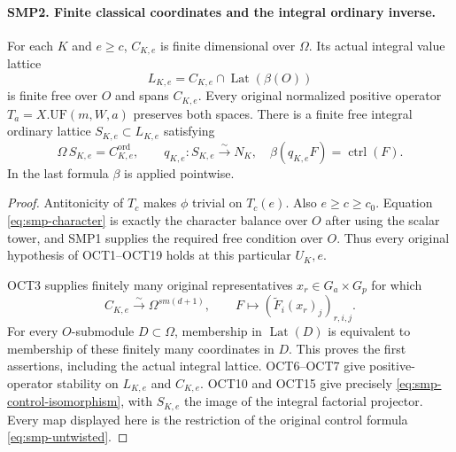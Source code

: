 \paragraph{SMP2. Finite classical coordinates and the integral ordinary inverse.}
\label{claim:SMP2}
For each $K$ and $e\geq c$, $C_{K,e}$ is finite
dimensional over $\Omega$.  Its actual integral value
lattice
\[
     L_{K,e}=C_{K,e}\cap\operatorname{Lat}(\beta(O))
\]
is finite free over $O$ and spans $C_{K,e}$.
Every original normalized positive operator
$T_a=X.\mathrm{UF}(m,W,a)$ preserves both spaces.
There is a finite free integral ordinary lattice
$S_{K,e}\subset L_{K,e}$ satisfying
\begin{equation}\label{eq:smp-control-isomorphism}
 \Omega\,S_{K,e}=C^{\mathrm{ord}}_{K,e},\qquad
 q_{K,e}:S_{K,e}\xrightarrow{\sim}N_K,
       \quad \beta(q_{K,e}F)=\operatorname{ctrl}(F).
\end{equation}
In the last formula $\beta$ is applied pointwise.
\begin{proof}
Antitonicity of $T_c$ makes $\phi$ trivial on $T_c(e)$.
Also $e\geq c\geq c_0$.  Equation
\eqref{eq:smp-character} is exactly the character
balance over $O$ after using the scalar tower, and
SMP1 supplies the required free condition over $O$.
Thus every original hypothesis of OCT1--OCT19 holds
at this particular $U_K,e$.

OCT3 supplies finitely many original representatives
$x_r\in G_a\times G_p$ for which
\begin{equation}\label{eq:smp-evaluation}
 C_{K,e}\xrightarrow{\sim}\Omega^{s m(d+1)},\qquad
            F\longmapsto(\widetilde F_i(x_r)_j)_{r,i,j}.
\end{equation}
For every $O$-submodule $D\subset\Omega$, membership
in $\operatorname{Lat}(D)$ is equivalent to membership
of these finitely many coordinates in $D$.
This proves the first assertions, including the actual
integral lattice.  OCT6--OCT7 give positive-operator
stability on $L_{K,e}$ and $C_{K,e}$.  OCT10 and OCT15
give precisely \eqref{eq:smp-control-isomorphism}, with
$S_{K,e}$ the image of the integral factorial projector.
Every map displayed here is the restriction of the
original control formula \eqref{eq:smp-untwisted}.
\end{proof}

